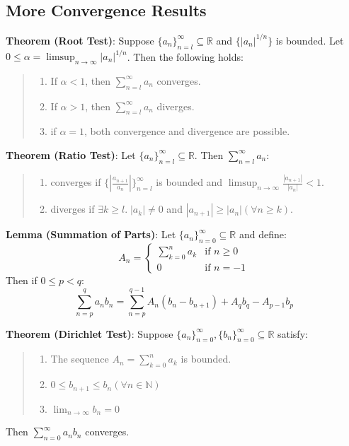 \documentclass[11pt]{article}
\begin{document}
\subsection{More Convergence Results}


\textbf{Theorem (Root Test)}: Suppose $\{a_n\}_{n=l}^\infty \subseteq \mathbb{R}$ and $\{|a_n|^{1/n}\}$ is bounded. Let $0 \leq \alpha = \limsup_{n \to \infty} |a_n|^{1/n}$. Then the following holds:
\begin{quote}\vspace{-0.3cm}
	\begin{enumerate}
	\item If $\alpha < 1$, then $\sum_{n=l}^\infty a_n$ converges.
	\item If $\alpha > 1$, then $\sum_{n=l}^\infty a_n$ diverges.
	\item if $\alpha = 1$, both convergence and divergence are possible.
	\end{enumerate}
\end{quote}

\textbf{Theorem (Ratio Test)}: Let $\{a_n\}_{n=l}^\infty \subseteq \mathbb{R}$. Then $\sum_{n=l}^\infty a_n$:
\begin{quote}\vspace{-0.3cm}
	\begin{enumerate}
	\item converges if $\{|\frac{a_{n+1}}{a_n}|\}_{n=l}^\infty$ is bounded and $\limsup_{n \to \infty} \frac{|a_{n+1}|}{|a_n|} < 1$.
	\item diverges if $\exists k \geq l.\; |a_k| \neq 0$ and $|a_{n+1}| \geq |a_n| (\forall n \geq k)$.
	\end{enumerate}
\end{quote}

\textbf{Lemma (Summation of Parts)}: Let $\{a_n\}_{n=0}^\infty \subseteq \mathbb{R}$ and define:
\[
A_n =
  \begin{cases}
   \sum_{k=0}^n a_k & \text{if } n \geq 0 \\
   0 & \text{if } n = -1
  \end{cases}
\]
Then if $0 \leq p < q$:
\begin{displaymath}
\sum_{n=p}^q a_nb_n = \sum_{n=p}^{q-1} A_n(b_n - b_{n+1}) + A_qb_q - A_{p-1}b_p
\end{displaymath}

\textbf{Theorem (Dirichlet Test)}: Suppose $\{a_n\}_{n=0}^\infty, \{b_n\}_{n=0}^\infty \subseteq \mathbb{R}$ satisfy:
\begin{quote}\vspace{-0.3cm}
	\begin{enumerate}
	\item The sequence $A_n = \sum_{k=0}^n a_k$ is bounded.
	\item $0 \leq b_{n+1} \leq b_n (\forall n \in \mathbb{N})$
	\item $\lim_{n \to \infty} b_n = 0$
	\end{enumerate}
\end{quote}
Then $\sum_{n=0}^\infty a_nb_n$ converges.
\end{document}
